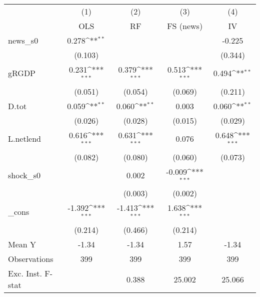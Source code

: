 {
\def\sym#1{\ifmmode^{#1}\else\(^{#1}\)\fi}
\begin{tabular}{l*{4}{c}}
\toprule
            &\multicolumn{1}{c}{(1)}&\multicolumn{1}{c}{(2)}&\multicolumn{1}{c}{(3)}&\multicolumn{1}{c}{(4)}\\
            &\multicolumn{1}{c}{OLS}&\multicolumn{1}{c}{RF}&\multicolumn{1}{c}{FS (news)}&\multicolumn{1}{c}{IV}\\
\midrule
news\_s0     &       0.278\sym{**} &                     &                     &      -0.225         \\
            &     (0.103)         &                     &                     &     (0.344)         \\
\addlinespace
gRGDP       &       0.231\sym{***}&       0.379\sym{***}&       0.513\sym{***}&       0.494\sym{**} \\
            &     (0.051)         &     (0.054)         &     (0.069)         &     (0.211)         \\
\addlinespace
D.tot       &       0.059\sym{**} &       0.060\sym{**} &       0.003         &       0.060\sym{**} \\
            &     (0.026)         &     (0.028)         &     (0.015)         &     (0.029)         \\
\addlinespace
L.netlend   &       0.616\sym{***}&       0.631\sym{***}&       0.076         &       0.648\sym{***}\\
            &     (0.082)         &     (0.080)         &     (0.060)         &     (0.073)         \\
\addlinespace
shock\_s0    &                     &       0.002         &      -0.009\sym{***}&                     \\
            &                     &     (0.003)         &     (0.002)         &                     \\
\addlinespace
\_cons      &      -1.392\sym{***}&      -1.413\sym{***}&       1.638\sym{***}&                     \\
            &     (0.214)         &     (0.466)         &     (0.214)         &                     \\
\midrule
Mean Y      &       -1.34         &       -1.34         &        1.57         &       -1.34         \\
Observations&         399         &         399         &         399         &         399         \\
Exc. Inst. F-stat&                     &       0.388         &      25.002         &      25.066         \\
\bottomrule
\end{tabular}
}
